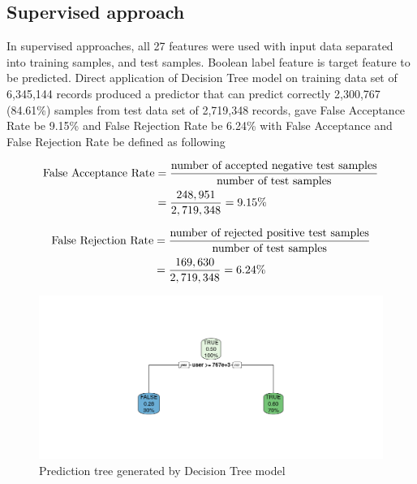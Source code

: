 \documentclass[English]{dicomopapers}
\begin{document}
\subsection{Supervised approach}
 In supervised approaches, all 27 features were used with input data separated into training samples, and test samples. Boolean label feature is target feature to be predicted.\newline
Direct application of Decision Tree model on training data set of 6,345,144 records produced a predictor that can predict correctly 2,300,767 (84.61\%) samples from test data set of 2,719,348 records, gave False Acceptance Rate be 9.15\% and False Rejection Rate be 6.24\% with False Acceptance and False Rejection Rate be defined as following
\begin{center}
  \begin{equation}
    \notag
    \begin{aligned}
      \text{False Acceptance Rate} &= \frac{\text{number of accepted negative test samples}}{\text{number of test samples}} \\
      &= \frac{248,951}{2,719,348}=9.15\%
    \end{aligned}
  \end{equation}
\end{center}
\begin{center}
  \begin{equation}
    \notag
    \begin{aligned}
      \text{False Rejection Rate} &= \frac{\text{number of rejected positive test samples}}{\text{number of test samples}} \\
      &= \frac{169,630}{2,719,348}=6.24\%
    \end{aligned}
  \end{equation}
\end{center}
\begin{figure}[ht]
  \vspace*{-0.7cm}
  \centering
  \includegraphics[width=\columnwidth,natwidth=1024,natheight=485]{dtree.png}
  \caption{Prediction tree generated by Decision Tree model}\label{fig:dtree}
\end{figure}
\end{document}
